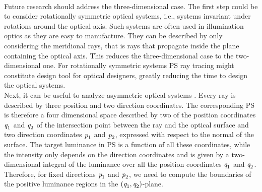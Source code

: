  \\ \indent 
Future research should address the three-dimensional case. The first step could be to consider rotationally symmetric optical systems, i.e., systems invariant under rotations around the optical axis. Such systems are often used in illumination optics as they are easy to manufacture. They can be described by only considering the meridional rays, that is rays that propagate inside the plane containing the optical axis. This reduces the three-dimensional case to the two-dimensional one. 
For rotationally symmetric systems PS ray tracing might constitute design tool for optical designers, greatly reducing the time to design the optical systems. 
\\ \indent  Next, it can be useful to analyze asymmetric optical systems \cite{ries1997performance}. Every ray is described by three position and two direction coordinates. The corresponding PS is therefore a four dimensional space described by two of the position coordinates $\textit{q}_1$ and $\textit{q}_2$ of the intersection point between the ray and the optical surface and two direction coordinates $\textit{p}_1$ and $\textit{p}_2$, expressed with respect to the normal of the surface. 
The target luminance in PS is a function of all these coordinates, while the intensity only depends on the direction coordinates and is given by a two-dimensional integral of the luminance over all the position coordinates $\textit{q}_1$ and $\textit{q}_2$. 
Therefore, for fixed directions $\textit{p}_1$ and $\textit{p}_2$, we need to compute the boundaries of the positive luminance regions in the $(\textit{q}_1, \textit{q}_2)$-plane. 

